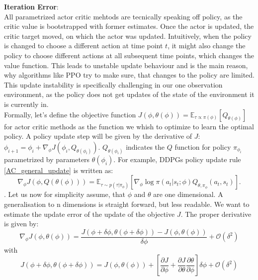 \textbf{Iteration Error}:\\
All parametrized actor critic mehtods are tecnically speaking off policy, as the critic value is bootstrapped with former estimates. Once the actor is updated, the 
critic target moved, on which the actor was updated. Intuitively, when the policy is changed to choose a different action at time point $t$, it might also change 
the policy to choose different actions at 
all subsequent time points, which changes the value function. This leads to unstable update behaviour and is the main reason, why algorithms like PPO try to 
make sure, that changes to the policy are limited. This update instability is specifically challenging in our one observation environment, as the policy does not 
get updates of the state of the environment it is currently in. \\
Formally, let's define the objective function $J(\phi, \theta(\phi)) = \mathbb{E}_{\tau \propto \pi(\phi)}\left[Q_{\theta(\phi)}\right]$ for actor critic methods as the function we whish to optimize to learn the optimal policy. 
A policy update step will be given by the derivative of $J$: $\phi_{i+1} = \phi_{i} + \nabla_{\phi}J(\phi_{i}, Q_{\theta(\phi_i)})$. $Q_{\theta(\phi_i)}$ indicates the $Q$ 
function for policy $\pi_{\phi_{i}}$ parametrized by parameters 
$\theta(\phi_i)$. For example, DDPGs policy update rule \ref{AC_general_update} is written as:
\begin{equation}
    \nabla_{\phi} J(\phi, Q(\theta(\phi))) = \mathbb{E}_{\tau \sim p(\tau | \pi_{\phi})} \left[\nabla_{\phi} \log \pi(a_t|s_t;\phi) Q_{\theta, \pi_\phi}(a_t, s_t) \right].
\end{equation}
. Let us now for simplicity assume, that $\phi$ and $\theta$ are one dimensional. A generalisation to n dimensions is straight forward, but less readable. We want 
to estimate the update error of the update of the objective $J$. The proper derivative is given by:
\begin{equation}
    \nabla_{\phi} J(\phi, \theta(\phi)) = \frac{J(\phi + \delta \phi, \theta(\phi + \delta \phi)) - J(\phi, \theta(\phi))}{\delta \phi} + \mathcal{O}(\delta^2)
\end{equation}
with 
\begin{equation}
    J(\phi + \delta \phi, \theta(\phi + \delta \phi)) = J(\phi, \theta(\phi)) + \left[ 
        \frac{\partial J}{\partial \phi} + \frac{\partial J}{\partial \theta} \frac{\partial \theta}{\partial \phi}
    \right] \delta \phi  + \mathcal{O}(\delta^2)
\end{equation}
